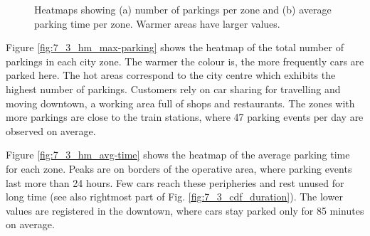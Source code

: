 \begin{figure}[th]
    \centering     %
    	\caption{Heatmaps showing (a) number of parkings per zone  and (b) average parking time per zone. Warmer areas have larger values. }
    	\label{fig:7_3_data_car}
\end{figure}

Figure \ref{fig:7_3_hm_max-parking} shows the heatmap of the total number of parkings in each city zone. The warmer the colour is, the more frequently cars are parked here. The hot areas correspond to the city centre which exhibits the highest number of parkings. Customers rely on car sharing for travelling and moving downtown, a working area full of shops and restaurants. The zones with more parkings are close to the train stations, where 47 parking events per day are observed on average.

Figure \ref{fig:7_3_hm_avg-time} shows the heatmap of the average parking time for each zone. Peaks are on borders of the operative area, where parking events last more than 24 hours. Few cars reach these peripheries  and rest unused for long time (see also rightmost part of Fig. \ref{fig:7_3_cdf_duration}). The lower values are registered in the downtown, where cars stay parked only for 85 minutes on average.


